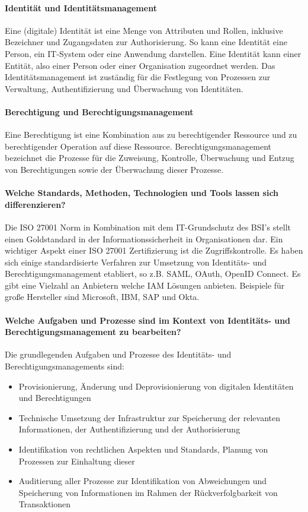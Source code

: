 \documentclass[12pt]{article}
\begin{document}
\paragraph{Identität und Identitätsmanagement}
Eine (digitale) Identität ist eine Menge von Attributen und Rollen, inklusive Bezeichner und Zugangsdaten zur Authorisierung. So kann eine Identität eine Person, ein IT-System oder eine Anwendung darstellen. Eine Identität kann einer Entität, also einer Person oder einer Organisation zugeordnet werden. Das Identitätsmanagement ist zuständig für die Festlegung von Prozessen zur Verwaltung, Authentifizierung und Überwachung von Identitäten.
\paragraph{Berechtigung und Berechtigungsmanagement}
Eine Berechtigung ist eine Kombination aus zu berechtigender Ressource und zu berechtigender Operation auf diese Ressource. Berechtigungsmanagement bezeichnet die Prozesse für die Zuweisung, Kontrolle, Überwachung und Entzug von Berechtigungen sowie der Überwachung dieser Prozesse.
\paragraph{Welche Standards, Methoden, Technologien und Tools lassen sich differenzieren?}
Die ISO 27001 Norm in Kombination mit dem IT-Grundschutz des BSI's stellt einen Goldstandard in der Informationssicherheit in Organisationen dar. Ein wichtiger Aspekt einer ISO 27001 Zertifizierung ist die Zugriffskontrolle.  Es haben sich einige standardisierte Verfahren zur Umsetzung von Identitäts- und Berechtigungsmanagement etabliert, so z.B. SAML, OAuth, OpenID Connect. Es gibt eine Vielzahl an Anbietern welche IAM Lösungen anbieten. Beispiele für große Hersteller sind Microsoft, IBM, SAP und Okta.
\paragraph{Welche Aufgaben und Prozesse sind im Kontext von Identitäts- und Berechtigungsmanagement zu bearbeiten?}
Die grundlegenden Aufgaben und Prozesse des Identitäts- und Berechtigungsmanagements sind:
\begin{itemize}
  \item Provisionierung, Änderung und Deprovisionierung von digitalen Identitäten und Berechtigungen
  \item Technische Umsetzung der Infrastruktur zur Speicherung der relevanten Informationen, der Authentifizierung und der Authorisierung
  \item Identifikation von rechtlichen Aspekten und Standards, Planung von Prozessen zur Einhaltung dieser
  \item Auditierung aller Prozesse zur Identifikation von Abweichungen und Speicherung von Informationen im Rahmen der Rückverfolgbarkeit von Transaktionen
\end{itemize}
\end{document}

